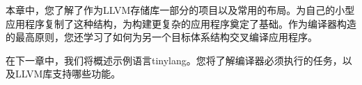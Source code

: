 本章中，您了解了作为LLVM存储库一部分的项目以及常用的布局。为自己的小型应用程序复制了这种结构，为构建更复杂的应用程序奠定了基础。作为编译器构造的最高原则，您还学习了如何为另一个目标体系结构交叉编译应用程序。\par

在下一章中，我们将概述示例语言tinylang。您将了解编译器必须执行的任务，以及LLVM库支持哪些功能。\par

\newpage